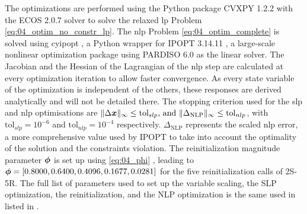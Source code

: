 The optimizations are performed using the Python package CVXPY 1.2.2  with the ECOS 2.0.7  solver to solve the relaxed \gls{lp} Problem \eqref{eq:04_optim_no_constr_lp}. The \gls{nlp} Problem \eqref{eq:04_optim_complete} is solved using cyipopt , a Python wrapper for IPOPT 3.14.11 , a large-scale nonlinear optimization package using PARDISO 6.0  as the linear solver. The Jacobian and the Hessian of the Lagrangian of the \gls{nlp} step are calculated at every optimization iteration to allow faster convergence. As every state variable of the optimization is independent of the others, these responses are derived analytically and will not be detailed there. The stopping criterion used for the \gls{slp} and \gls{nlp} optimisations are $\lVert\Delta \bm{x}\rVert_\infty \leq \text{tol}_{slp}  \text{, and } \lVert\Delta_{\text{NLP}}\rVert_\infty \leq \text{tol}_{nlp}$, with $\text{tol}_{slp}=10^{-6}$ and $\text{tol}_{nlp}=10^{-4}$ respectively. $\Delta_{\text{NLP}}$ represents the scaled \gls{nlp} error, a more comprehensive value used by IPOPT to take into account the optimality of the solution and the constraints violation. The reinitialization magnitude parameter $\bm{\phi}$ is set up using \eqref{eq:04_phi} , leading to $\bm{\phi} = \left[ 0.8000, 0.6400, 0.4096, 0.1677, 0.0281 \right]$ for the five reinitialization calls of 2S-5R. The full list of parameters used to set up the variable scaling, the SLP optimization, the reinitialization, and the NLP optimization is the same used in  listed in .

